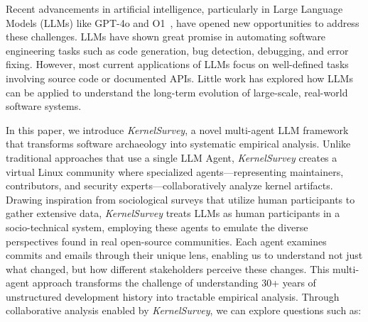 \documentclass[sigconf,review,anonymous]{acmart}
\newcommand{\sys}{\textit{KernelSurvey}\xspace}
\begin{document}
Recent advancements in artificial intelligence, particularly in Large Language Models (LLMs) like GPT-4o\cite{gpt4o} and O1~\cite{o1}, have opened new opportunities to address these challenges. LLMs have shown great promise in automating software engineering tasks such as code generation\cite{zheng2024kgent}, bug detection\cite{li2024enhancing}, debugging\cite{chen2023teaching}, and error fixing\cite{deligiannis2023fixing}. However, most current applications of LLMs focus on well-defined tasks involving source code or documented APIs. Little work has explored how LLMs can be applied to understand the long-term evolution of large-scale, real-world software systems.

In this paper, we introduce \sys, a novel multi-agent LLM framework that transforms software archaeology into systematic empirical analysis. Unlike traditional approaches that use a single LLM Agent, \sys creates a virtual Linux community where specialized agents—representing maintainers, contributors, and security experts—collaboratively analyze kernel artifacts. Drawing inspiration from sociological surveys that utilize human participants to gather extensive data, \sys treats LLMs as human participants in a socio-technical system, employing these agents to emulate the diverse perspectives found in real open-source communities. Each agent examines commits and emails\cite{linux,tan2019communicate,schneider2016differentiating} through their unique lens, enabling us to understand not just what changed, but how different stakeholders perceive these changes. This multi-agent approach transforms the challenge of understanding 30+ years of unstructured development history into tractable empirical analysis. Through collaborative analysis enabled by \sys, we can explore questions such as:
\end{document}
